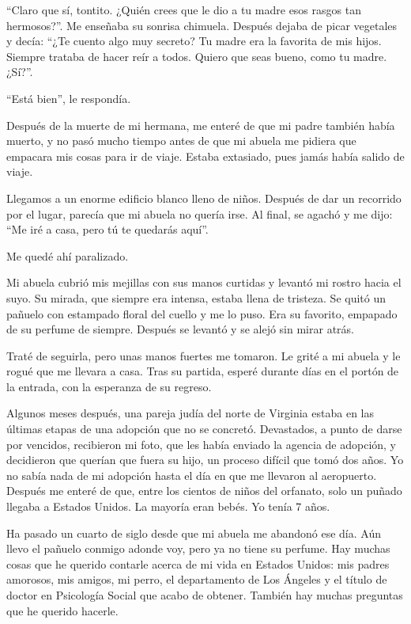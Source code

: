 ``Claro que sí, tontito. ¿Quién crees que le dio a tu madre esos rasgos
tan hermosos?''. Me enseñaba su sonrisa chimuela. Después dejaba de
picar vegetales y decía: ``¿Te cuento algo muy secreto? Tu madre era la
favorita de mis hijos. Siempre trataba de hacer reír a todos. Quiero que
seas bueno, como tu madre. ¿Sí?''.

``Está bien'', le respondía.

Después de la muerte de mi hermana, me enteré de que mi padre también
había muerto, y no pasó mucho tiempo antes de que mi abuela me pidiera
que empacara mis cosas para ir de viaje. Estaba extasiado, pues jamás
había salido de viaje.

Llegamos a un enorme edificio blanco lleno de niños. Después de dar un
recorrido por el lugar, parecía que mi abuela no quería irse. Al final,
se agachó y me dijo: ``Me iré a casa, pero tú te quedarás aquí''.

Me quedé ahí paralizado.

Mi abuela cubrió mis mejillas con sus manos curtidas y levantó mi rostro
hacia el suyo. Su mirada, que siempre era intensa, estaba llena de
tristeza. Se quitó un pañuelo con estampado floral del cuello y me lo
puso. Era su favorito, empapado de su perfume de siempre. Después se
levantó y se alejó sin mirar atrás.

Traté de seguirla, pero unas manos fuertes me tomaron. Le grité a mi
abuela y le rogué que me llevara a casa. Tras su partida, esperé durante
días en el portón de la entrada, con la esperanza de su regreso.

Algunos meses después, una pareja judía del norte de Virginia estaba en
las últimas etapas de una adopción que no se concretó. Devastados, a
punto de darse por vencidos, recibieron mi foto, que les había enviado
la agencia de adopción, y decidieron que querían que fuera su hijo, un
proceso difícil que tomó dos años. Yo no sabía nada de mi adopción hasta
el día en que me llevaron al aeropuerto. Después me enteré de que, entre
los cientos de niños del orfanato, solo un puñado llegaba a Estados
Unidos. La mayoría eran bebés. Yo tenía 7 años.

Ha pasado un cuarto de siglo desde que mi abuela me abandonó ese día.
Aún llevo el pañuelo conmigo adonde voy, pero ya no tiene su perfume.
Hay muchas cosas que he querido contarle acerca de mi vida en Estados
Unidos: mis padres amorosos, mis amigos, mi perro, el departamento de
Los Ángeles y el título de doctor en Psicología Social que acabo de
obtener. También hay muchas preguntas que he querido hacerle.

